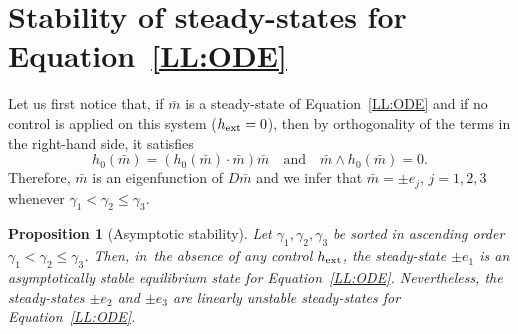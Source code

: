 \documentclass[JEP,XML,SOM,Unicode,NoEqCountersInSection,NoFloatCountersInSection,published]{cedram}
\newtheorem{proposition}[theorem]{Proposition}
\theoremstyle{definition}
\begin{document}
\section{Stability of steady-states for Equation~\texorpdfstring{\eqref{LL:ODE}}{(3)}}\label{append:e1AS}
Let us first notice that, if $\bar m$ is a steady-state of Equation~\eqref{LL:ODE} and if no control is applied on this system ($h_{\rm ext}=0$), then by orthogonality of the terms in the right-hand side, it satisfies
\[
h_0(\bar m)=(h_0(\bar m)\cdot \bar m)\bar m\quad \text{and}\quad \bar m\wedge h_0(\bar m)=0.
\]
Therefore, $\bar m$ is an eigenfunction of $D\bar m$ and we infer that $\bar m=\pm e_j$, $j=1,2,3$ whenever $\gamma_1<\gamma_2\leq \gamma_3$.
\begin{proposition}[Asymptotic stability] \label{prop:asympt_stab}
Let $\gamma_1, \gamma_2, \gamma_3$ be sorted in ascending order $\gamma_1<\gamma_2\leq\gamma_3$. Then, in~the absence of any control $h_{\rm ext}$, the steady-state $\pm e_1$ is an asymptotically stable equilibrium state for Equation~\eqref{LL:ODE}. Nevertheless, the steady-states $\pm e_2$ and $\pm e_3$ are linearly unstable steady-states for Equation~\eqref{LL:ODE}.
\end{proposition}
\end{document}
